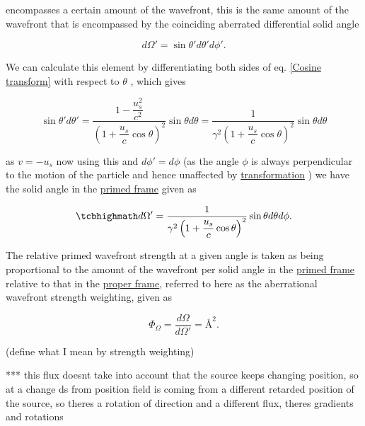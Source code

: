encompasses a certain amount of the wavefront, this is the same amount of the wavefront that is encompassed by the coinciding aberrated differential solid angle

\begin{equation}
	d\Omega' = \sin{\theta'} d\theta' d\phi'.
\end{equation}

We can calculate this element by differentiating both sides of eq. \eqref{Cosine transform} with respect to $\theta$ \cite{hogg1997special}, which gives

\begin{equation}
	\sin{\theta'} d\theta' =   \dfrac{1-\dfrac{u_s^2}{c^2}}{\left(1+\dfrac{u_s}{c}\cos{\theta}\right)^2} \sin{\theta} d\theta =  \dfrac{1}{\gamma^2\left(1+\dfrac{u_s}{c}\cos{\theta}\right)^2} \sin{\theta} d\theta
\end{equation}

as $v=-u_s$ now using this and $d\phi'=d\phi$ (as the angle $\phi$ is always perpendicular to the motion of the particle and hence unaffected by \hyperlink{def-transform}{transformation} ) we have the solid angle in the \hyperlink{def-Primed-Frame}{primed frame} given as

\begin{equation}
	\mhl{
		d\Omega' = \dfrac{1}{\gamma^2\left(1+\dfrac{u_s}{c}\cos{\theta}\right)^2} \sin{\theta} d\theta d\phi.
	}
\end{equation}

The relative primed wavefront strength at a given angle is taken as being proportional to the amount of the wavefront per solid angle in the \hyperlink{def-Primed-Frame}{primed frame} relative to that in the \hyperlink{def-proper-frame}{proper frame}, referred to here as the aberrational wavefront strength weighting, given as

\begin{equation}
	\label{eq: aberrational wavefront weighting}
	\Phi_\Omega = \frac{d\Omega}{d\Omega'} = \text{\AA}^2.
\end{equation}

(define what I mean by strength weighting)

*** this flux doesnt take into account that the source keeps changing position, so at a change ds from position field is coming from a different retarded position of the source, so theres a rotation of direction and a different flux, theres gradients and rotations

